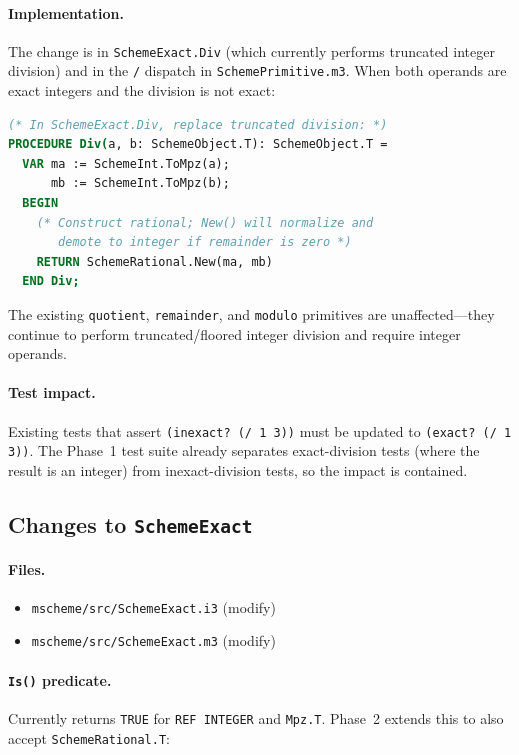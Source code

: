 \documentclass[12pt]{article}
\begin{document}
\paragraph{Implementation.}
The change is in {\tt SchemeExact.Div} (which currently performs
truncated integer division) and in the {\tt /} dispatch in
{\tt SchemePrimitive.m3}.  When both operands are exact integers
and the division is not exact:

\begin{lstlisting}[language=Modula3]
(* In SchemeExact.Div, replace truncated division: *)
PROCEDURE Div(a, b: SchemeObject.T): SchemeObject.T =
  VAR ma := SchemeInt.ToMpz(a);
      mb := SchemeInt.ToMpz(b);
  BEGIN
    (* Construct rational; New() will normalize and
       demote to integer if remainder is zero *)
    RETURN SchemeRational.New(ma, mb)
  END Div;
\end{lstlisting}

\noindent The existing {\tt quotient}, {\tt remainder}, and
{\tt modulo} primitives are unaffected---they continue to perform
truncated/floored integer division and require integer operands.

\paragraph{Test impact.}
Existing tests that assert {\tt (inexact?\ (/ 1 3))} must be
updated to {\tt (exact?\ (/ 1 3))}.  The Phase~1 test suite
already separates exact-division tests (where the result is an
integer) from inexact-division tests, so the impact is contained.

\subsection{Changes to {\tt SchemeExact}}

\paragraph{Files.}
\begin{itemize}[nosep]
\item {\tt mscheme/src/SchemeExact.i3} (modify)
\item {\tt mscheme/src/SchemeExact.m3} (modify)
\end{itemize}

\paragraph{{\tt Is()} predicate.}
Currently returns {\tt TRUE} for {\tt REF INTEGER} and {\tt Mpz.T}.
Phase~2 extends this to also accept {\tt SchemeRational.T}:
\end{document}
